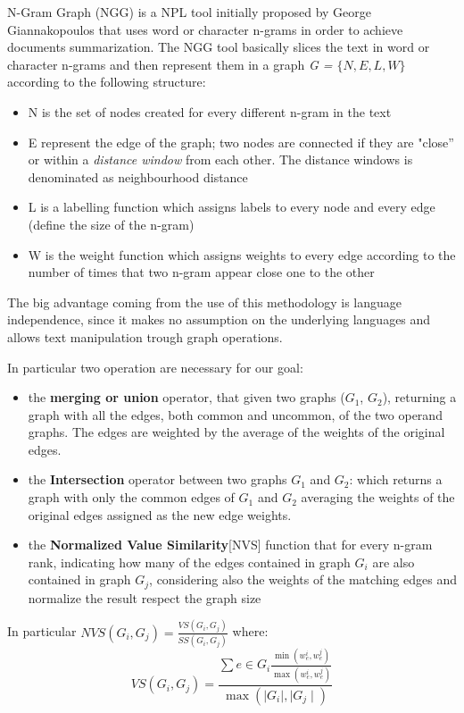N-Gram Graph (NGG) is a NPL tool initially proposed by George Giannakopoulos \cite{Ngram} that uses word or character n-grams in order to achieve documents summarization. The NGG tool basically slices the text in word or character n-grams and then represent them in a graph \emph{G = $\lbrace N,E,L,W\rbrace$} according to the following structure:
\begin{itemize}
	\item N is the set of nodes created for every different n-gram in the text
	\item E represent the edge of the graph; two nodes are connected if they are "close'' or within a \emph{distance window} from each other. The distance windows is denominated as neighbourhood distance
	\item L is a labelling function which assigns labels to every node and every edge (define the size of the n-gram)
	\item W is the weight function which assigns weights to every edge according to the number of times that two n-gram appear close one to the other
\end{itemize}

The big advantage coming from the use of this methodology is language
independence, since it makes no assumption on the underlying languages and
allows text manipulation trough graph operations.

In particular two operation are necessary for our goal:
\begin{itemize}
\item the \textbf{merging or union } operator, that given two graphs ($G_1$, $G_2$), returning a graph with all the edges, both common and uncommon, of the two operand graphs. The edges are weighted by the average of the weights of the original edges.
\item the \textbf{Intersection} operator between two graphs $G_1$ and $G_2$: which returns a graph with only the common edges of $G_1$ and $G_2$ averaging the weights of the original edges assigned as the new edge weights.
\item the \textbf{Normalized Value Similarity}[NVS] function that for every n-gram rank, indicating how many of the edges contained in graph $G_i$ are also contained in graph $G_j$, considering also the weights of the matching edges and normalize the result respect the graph size
\end{itemize}

In particular $NVS(G_i,G_j) = \frac{VS(G_i,G_j)}{SS(G_i,G_j)}$ where:
\begin{equation}
 VS(G_i,G_j)=\frac{\sum e \in G_i \frac{\min(w_e^i, w_e^j)}{\max(w_e^i, w_e^j)}}{\max(\mid G_i \mid, \mid G_j \mid)}
\end{equation}

